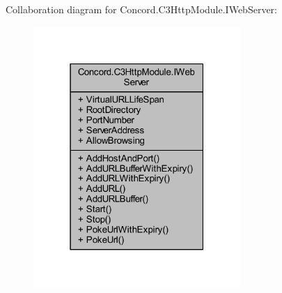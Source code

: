 Collaboration diagram for Concord.\+C3\+Http\+Module.\+I\+Web\+Server\+:\nopagebreak
\begin{figure}[H]
\begin{center}
\leavevmode
\includegraphics[width=223pt]{interface_concord_1_1_c3_http_module_1_1_i_web_server__coll__graph}
\end{center}
\end{figure}
